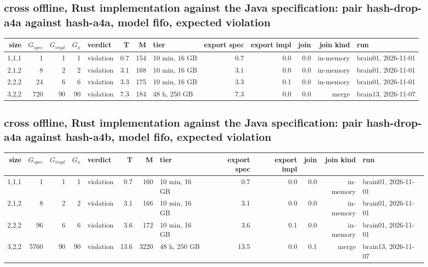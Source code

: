 \documentclass[10pt]{article}
\begin{document}
\subsection*{cross offline, Rust implementation against the Java specification: pair \textsf{hash-drop-a4a} against \textsf{hash-a4a}, model fifo, expected violation}
\begin{longtable}{@{}rrrrlrrlrrrrl@{}}
\toprule
size & $G_{\mathit{spec}}$ & $G_{\mathit{impl}}$ & $G_x$ & verdict & T & M & tier & export spec & export impl & join & join kind & run \\
\midrule
\endhead
\color{red} 1,1,1 & 1 & 1 & 1 & violation & 0.7 & 154 & 10 min, 16 GB & 0.7 & 0.0 & 0.0 & in-memory & brain01, 2026-11-01 \\
\color{red} 2,1,2 & 8 & 2 & 2 & violation & 3.1 & 168 & 10 min, 16 GB & 3.1 & 0.0 & 0.0 & in-memory & brain01, 2026-11-01 \\
\color{red} 2,2,2 & 24 & 6 & 6 & violation & 3.3 & 175 & 10 min, 16 GB & 3.3 & 0.1 & 0.0 & in-memory & brain01, 2026-11-01 \\
\color{red} 3,2,2 & 720 & 90 & 90 & violation & 7.3 & 184 & 48 h, 250 GB & 7.3 & 0.0 & 0.0 & merge & brain13, 2026-11-07 \\
\bottomrule
\end{longtable}
\subsection*{cross offline, Rust implementation against the Java specification: pair \textsf{hash-drop-a4a} against \textsf{hash-a4b}, model fifo, expected violation}
\begin{longtable}{@{}rrrrlrrlrrrrl@{}}
\toprule
size & $G_{\mathit{spec}}$ & $G_{\mathit{impl}}$ & $G_x$ & verdict & T & M & tier & export spec & export impl & join & join kind & run \\
\midrule
\endhead
\color{red} 1,1,1 & 1 & 1 & 1 & violation & 0.7 & 160 & 10 min, 16 GB & 0.7 & 0.0 & 0.0 & in-memory & brain01, 2026-11-01 \\
\color{red} 2,1,2 & 8 & 2 & 2 & violation & 3.1 & 166 & 10 min, 16 GB & 3.1 & 0.0 & 0.0 & in-memory & brain01, 2026-11-01 \\
\color{red} 2,2,2 & 96 & 6 & 6 & violation & 3.6 & 172 & 10 min, 16 GB & 3.6 & 0.1 & 0.0 & in-memory & brain01, 2026-11-01 \\
\color{red} 3,2,2 & 5760 & 90 & 90 & violation & 13.6 & 3220 & 48 h, 250 GB & 13.5 & 0.0 & 0.1 & merge & brain13, 2026-11-07 \\
\bottomrule
\end{longtable}
\end{document}
